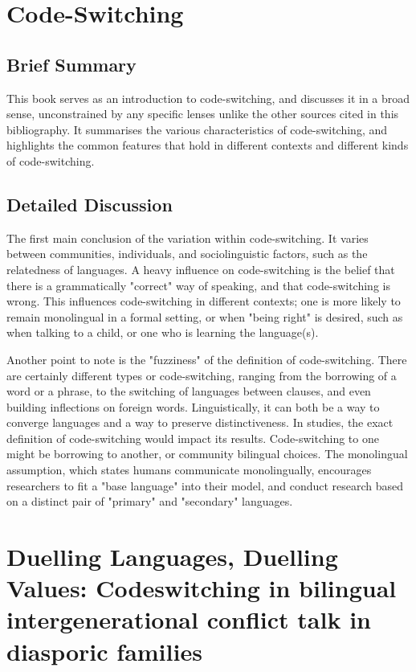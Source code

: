 \documentclass[12pt]{article}
\begin{document}
\section{Code-Switching~\cite{cs}}

\subsection{Brief Summary}

This book serves as an introduction to code-switching, and discusses it in a broad sense, unconstrained by any specific lenses unlike the other sources cited in this bibliography. It summarises the various characteristics of code-switching, and highlights the common features that hold in different contexts and different kinds of code-switching.

\subsection{Detailed Discussion}

The first main conclusion of the variation within code-switching. It varies between communities, individuals, and sociolinguistic factors, such as the relatedness of languages. A heavy influence on code-switching is the belief that there is a grammatically "correct" way of speaking, and that code-switching is wrong. This influences code-switching in different contexts; one is more likely to remain monolingual in a formal setting, or when "being right" is desired, such as when talking to a child, or one who is learning the language(s).

Another point to note is the "fuzziness" of the definition of code-switching. There are certainly different types or code-switching, ranging from the borrowing of a word or a phrase, to the switching of languages between clauses, and even building inflections on foreign words. Linguistically, it can both be a way to converge languages and a way to preserve distinctiveness. In studies, the exact definition of code-switching would impact its results. Code-switching to one might be borrowing to another, or community bilingual choices. The monolingual assumption, which states humans communicate monolingually, encourages researchers to fit a "base language" into their model, and conduct research based on a distinct pair of "primary" and "secondary" languages.

\section{Duelling Languages, Duelling Values: Codeswitching in bilingual intergenerational conflict talk in diasporic families~\cite{conflict}}
\end{document}
